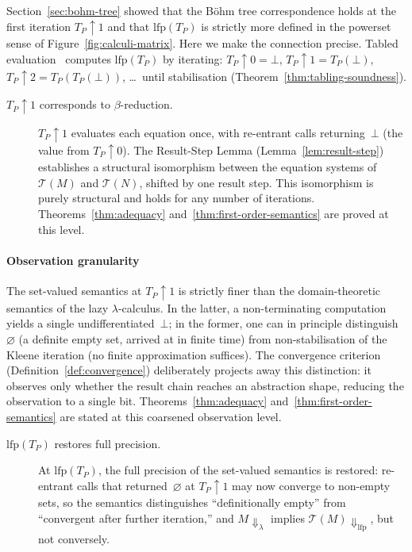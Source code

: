 \begin{remark}
  \label{rem:convergence-lfp}
  Section~\ref{sec:bohm-tree} showed that the B\"ohm tree
  correspondence holds at the first iteration
  $T_P\!\uparrow\!1$ and that $\mathrm{lfp}(T_P)$ is
  strictly more defined in the powerset sense of
  Figure~\ref{fig:calculi-matrix}.
  Here we make the connection precise.
  Tabled evaluation~\cite{tamaki1986-tabled-resolution}
  computes $\mathrm{lfp}(T_P)$ by iterating:
  $T_P\!\uparrow\!0 = \bot$,
  $T_P\!\uparrow\!1 = T_P(\bot)$,
  $T_P\!\uparrow\!2 = T_P(T_P(\bot))$,
  \ldots\ until stabilisation
  (Theorem~\ref{thm:tabling-soundness}).

  \begin{description}
    \item[$T_P\!\uparrow\!1$ corresponds to
      $\beta$-reduction.]
      $T_P\!\uparrow\!1$ evaluates each equation once,
      with re-entrant calls returning~$\bot$
      (the value from $T_P\!\uparrow\!0$).
      The Result-Step Lemma
      (Lemma~\ref{lem:result-step}) establishes a
      structural isomorphism between the equation
      systems of $\mathcal{T}(M)$ and
      $\mathcal{T}(N)$, shifted by one
      $\mathrm{result}$ step.
      This isomorphism is purely structural and holds
      for any number of iterations.
      Theorems~\ref{thm:adequacy}
      and~\ref{thm:first-order-semantics}
      are proved at this level.
  \end{description}

  \paragraph{Observation granularity}%
  \label{rem:set-vs-domain}
  The set-valued semantics at $T_P\!\uparrow\!1$ is
  strictly finer than the domain-theoretic semantics of
  the lazy $\lambda$-calculus.
  In the latter, a non-terminating computation yields a
  single undifferentiated~$\bot$;
  in the former, one can in principle distinguish
  $\varnothing$ (a definite empty set, arrived at in
  finite time) from non-stabilisation of the Kleene
  iteration (no finite approximation suffices).
  The convergence criterion
  (Definition~\ref{def:convergence}) deliberately
  projects away this distinction: it observes only
  whether the $\mathrm{result}$ chain reaches an abstraction
  shape, reducing the observation to a single bit.
  Theorems~\ref{thm:adequacy}
  and~\ref{thm:first-order-semantics}
  are stated at this coarsened observation level.

  \begin{description}
    \item[$\mathrm{lfp}(T_P)$ restores full precision.]
      At $\mathrm{lfp}(T_P)$, the full precision of the
      set-valued semantics is restored: re-entrant calls
      that returned~$\varnothing$ at $T_P\!\uparrow\!1$
      may now converge to non-empty sets, so the semantics
      distinguishes ``definitionally empty'' from
      ``convergent after further iteration,''
      and $M{\Downarrow}_\lambda$ implies
      $\mathcal{T}(M){\Downarrow}_{\mathrm{lfp}}$,
      but not conversely.
  \end{description}
\end{remark}

